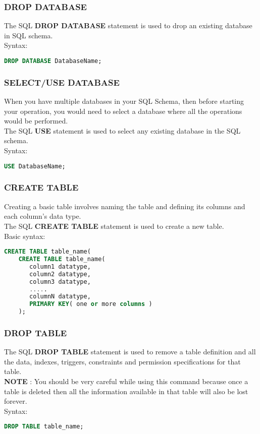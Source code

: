  \subsubsection*{{DROP DATABASE}}
 The SQL \textbf{DROP DATABASE} statement is used to drop an existing database in SQL schema.\\
 Syntax: 
 \begin{lstlisting}[language=SQL]
    DROP DATABASE DatabaseName;
 \end{lstlisting}

 \subsubsection*{{SELECT/USE DATABASE}}
 When you have multiple databases in your SQL Schema, then before starting your operation, you would need to select a database where all the operations would be performed.\\
The SQL \textbf{USE} statement is used to select any existing database in the SQL schema.\\
 Syntax: 
 \begin{lstlisting}[language=SQL]
    USE DatabaseName;
 \end{lstlisting}
 
 \subsubsection*{{CREATE TABLE}}
 Creating a basic table involves naming the table and defining its columns and each column's data type.\\
The SQL \textbf{CREATE TABLE} statement is used to create a new table.\\
 Basic syntax: 
 \begin{lstlisting}[language=SQL]
    CREATE TABLE table_name(
    CREATE TABLE table_name(
       column1 datatype,
       column2 datatype,
       column3 datatype,
       .....
       columnN datatype,
       PRIMARY KEY( one or more columns )
    );
 \end{lstlisting}
 
 \subsubsection*{{DROP TABLE}}
 The SQL \textbf{DROP TABLE} statement is used to remove a table definition and all the data, indexes, triggers, constraints and permission specifications for that table.\\
 \textbf{NOTE} : You should be very careful while using this command because once a table is deleted then all the information available in that table will also be lost forever.\\
 Syntax: 
 \begin{lstlisting}[language=SQL]
    DROP TABLE table_name;
 \end{lstlisting}
 
